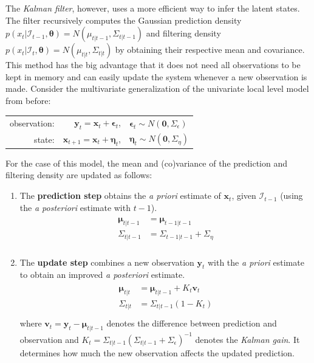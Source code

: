 \documentclass[11pt, oneside]{scrreprt}   	%
\begin{document}
The \textit{Kalman filter}, however, uses a more efficient way to infer the latent states. 
The filter recursively computes the Gaussian prediction density $p(x_{t} | \mathcal{I}_{t-1}, \boldsymbol{\theta}) = N(\mu_{t | t-1}, \Sigma_{t | t-1})$ and filtering density $p(x_{t} | \mathcal{I}_{t}, \boldsymbol{\theta}) = N(\mu_{t | t}, \Sigma_{t | t})$ by obtaining their respective mean and covariance. 
This method has the big advantage that it does not need all observations to be kept in memory and can easily update the system whenever a new observation is made.
Consider the multivariate generalization of the univariate local level model from before:
\bigskip
\begin{center}
\begin{tabular}{ r r l }
  observation: & $\boldsymbol{y}_t = \boldsymbol{x}_t + \boldsymbol{\epsilon}_t$, & $\boldsymbol{\epsilon}_t \sim N(\textbf{0}, \Sigma_{\epsilon})$ \\
  state: & $\boldsymbol{x}_{t+1} = \boldsymbol{x}_t + \boldsymbol{\eta}_t$, & $\boldsymbol{\eta}_t \sim N(\textbf{0}, \Sigma_{\eta})$ \\
\end{tabular}
\end{center}
\bigskip
For the case of this model, the mean and (co)variance of the prediction and filtering density are updated as follows:
\begin{enumerate}
	\item The \textbf{prediction step} obtains the \textit{a priori} estimate of $\boldsymbol{x}_t$, given $\mathcal{I}_{t-1}$ (using the \textit{a posteriori} estimate with $t-1$).
		\begin{align} 
		\begin{split}
		\boldsymbol{\mu}_{t | t-1} &= \boldsymbol{\mu}_{t-1 | t-1}\\
		\Sigma_{t | t-1} &= \Sigma_{t-1 | t-1} + \Sigma_{\eta}\\
		\end{split}					
		\end{align} 
	\item The \textbf{update step} combines a new observation $\boldsymbol{y}_t$ with the \textit{a priori} estimate to obtain an improved \textit{a posteriori} estimate. 
		\begin{align} 
		\begin{split}
		\boldsymbol{\mu}_{t | t} &= \boldsymbol{\mu}_{t | t-1} + K_t \boldsymbol{v}_t\\
		\Sigma_{t | t} &= \Sigma_{t | t-1}(1 - K_t)\\
		\end{split}					
		\end{align} 
		where $\boldsymbol{v}_t = \boldsymbol{y}_t - \boldsymbol{\mu}_{t | t-1}$ denotes the difference between prediction and observation and $K_t = \Sigma_{t | t-1} (\Sigma_{t | t-1} + \Sigma_{\epsilon})^{-1}$ denotes the \textit{Kalman gain}. It determines how much the new observation affects the updated prediction.	
\end{enumerate}
\end{document}

